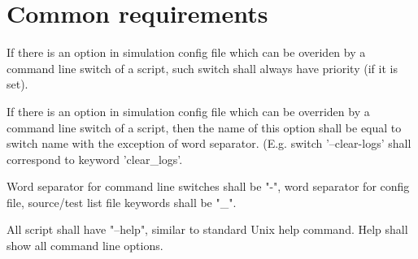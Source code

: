\documentclass{tropic_design_spec}
\begin{document}
\pagebreak

\section{Common requirements}



    {If there is an option in simulation config file which can be overiden by a command
     line switch of a script, such switch shall always have priority (if it is set).}


    {If there is an option in simulation config file which can be overriden by a command
     line switch of a script, then the name of this option shall be equal to switch name
     with the exception of word separator. (E.g. switch '--clear-logs' shall correspond
     to keyword 'clear_logs'.}


    {Word separator for command line switches shall be "-", word separator for config
     file, source/test list file keywords shall be "_".}


    {All script shall have "--help", similar to standard Unix help command. Help shall
     show all command line options.}


\ReqSubStart
\ReqSubEnd

\end{document}
